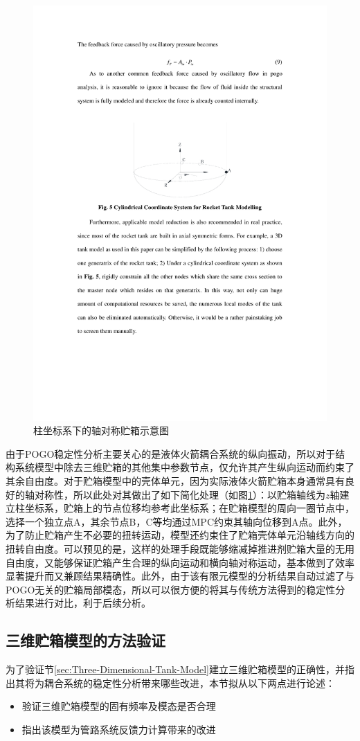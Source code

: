 \begin{figure}[!htb]
  \centering
  \includegraphics[width=.4\linewidth]{Axial-Symmetric-Tank-Model.pdf}
  \caption{柱坐标系下的轴对称贮箱示意图}\label{Axial-Symmetric-Tank-Model}
\end{figure}

由于POGO稳定性分析主要关心的是液体火箭耦合系统的纵向振动，所以对于结构系统模型中除去三维贮箱的其他集中参数节点，仅允许其产生纵向运动而约束了其余自由度。对于贮箱模型中的壳体单元，因为实际液体火箭贮箱本身通常具有良好的轴对称性，所以此处对其做出了如下简化处理（如图\ref{Axial-Symmetric-Tank-Model}）：以贮箱轴线为$z$轴建立柱坐标系，贮箱上的节点位移均参考此坐标系；在贮箱模型的周向一圈节点中，选择一个独立点A，其余节点B，C等均通过MPC约束其轴向位移到A点。此外，为了防止贮箱产生不必要的扭转运动，模型还约束住了贮箱壳体单元沿轴线方向的扭转自由度。可以预见的是，这样的处理手段既能够缩减掉推进剂贮箱大量的无用自由度，又能够保证贮箱产生合理的纵向运动和横向轴对称运动，基本做到了效率显著提升而又兼顾结果精确性。此外，由于该有限元模型的分析结果自动过滤了与POGO无关的贮箱局部模态，所以可以很方便的将其与传统方法得到的稳定性分析结果进行对比，利于后续分析。

\subsection{三维贮箱模型的方法验证}
为了验证节\ref{sec:Three-Dimensional-Tank-Model}建立三维贮箱模型的正确性，并指出其将为耦合系统的稳定性分析带来哪些改进，本节拟从以下两点进行论述：
\begin{itemize}
\item 验证三维贮箱模型的固有频率及模态是否合理
\item 指出该模型为管路系统反馈力计算带来的改进
\end{itemize}

